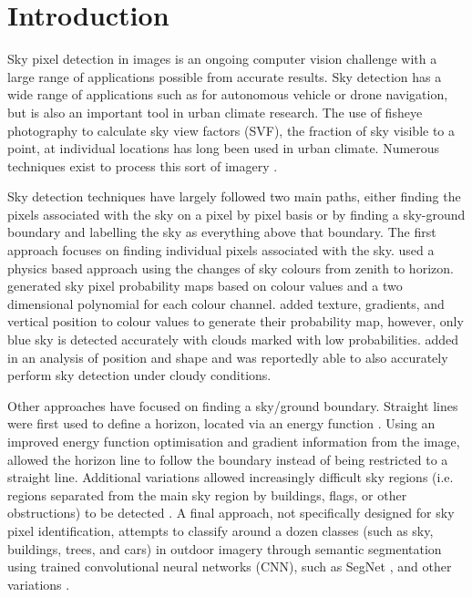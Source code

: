 \documentclass[final,3p,times,authoryear]{elsarticle}
\begin{document}
\section{Introduction}\label{sec:introduction}
Sky pixel detection in images is an ongoing computer vision challenge with a large range of applications possible from accurate results. Sky detection has a wide range of applications such as for autonomous vehicle or drone navigation, but is also an important tool in urban climate research. The use of fisheye photography to calculate sky view factors (SVF), the fraction of sky visible to a point, at individual locations has long been used in urban climate. Numerous techniques exist to process this sort of imagery \citep{Grimmond2001,Chapman2004,Ali-Toudert2007}.

Sky detection techniques have largely followed two main paths, either finding the pixels associated with the sky on a pixel by pixel basis or by finding a sky-ground boundary and labelling the sky as everything above that boundary. The first approach focuses on finding individual pixels associated with the sky. \cite{Luo2002} used a physics based approach using the changes of sky colours from zenith to horizon. \cite{Gallagher2004} generated sky pixel probability maps based on colour values and a two dimensional polynomial for each colour channel. \cite{Zafarifar2007} added texture, gradients, and vertical position to colour values to generate their probability map, however, only blue sky is detected accurately with clouds marked with low probabilities. \cite{Schmitt2009} added in an analysis of position and shape and was reportedly able to also accurately perform sky detection under cloudy conditions. 

Other approaches have focused on finding a sky/ground boundary. Straight lines were first used to define a horizon, located via an energy function \citep{Ettinger2003}. Using an improved energy function optimisation and gradient information from the image, \cite{Shen2013} allowed the horizon line to follow the boundary instead of being restricted to a straight line. Additional variations allowed increasingly difficult sky regions (i.e. regions separated from the main sky region by buildings, flags, or other obstructions) to be detected \citep{Zhijie2014,Zhijie2015}. A final approach, not specifically designed for sky pixel identification, attempts to classify around a dozen classes (such as sky, buildings, trees, and cars) in outdoor imagery through semantic segmentation using trained convolutional neural networks (CNN), such as SegNet \citep{Badrinarayanan2017}, and other variations \citep{Holder2016,Middel2019}.
\end{document}
